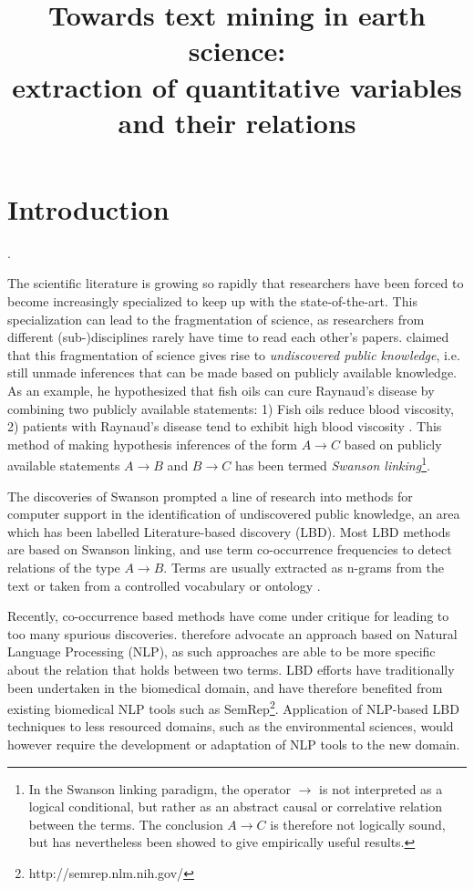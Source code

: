 \documentclass[10pt, a4paper]{article}
\title{Towards text mining in earth science:\\
extraction of quantitative variables and their relations}
\begin{document}
\maketitleabstract

\section{Introduction}


.

The scientific literature is growing so rapidly that researchers have been forced to become increasingly specialized to keep up with the state-of-the-art. 
This specialization can lead to the fragmentation of science, as researchers from different (sub-)disciplines rarely have time to read each other's papers. 
 claimed that this fragmentation of science gives rise to \emph{undiscovered public knowledge}, i.e. still unmade inferences that can be made based on publicly available knowledge. As an example, he hypothesized that fish oils can cure Raynaud's disease by combining two publicly available statements: 1) Fish oils reduce blood viscosity, 2) patients with Raynaud's disease tend to exhibit high blood viscosity \cite{Swanson1986Fishoil}. 
This method of making hypothesis inferences of the form $A \to C$ based on publicly available statements $A \to B$ and $B \to C$ has been termed \emph{Swanson linking}\footnote{In the Swanson linking paradigm, the operator $\to$ is not interpreted as a logical conditional, but rather as an abstract causal or correlative relation between the terms. The conclusion $A \to C$ is therefore not logically sound, but has nevertheless been showed to give empirically useful results.}. 

The discoveries of Swanson prompted a line of research into methods for computer support in the identification of undiscovered public knowledge, an area which has been labelled Literature-based discovery (LBD). 
Most LBD methods are based on Swanson linking, and use term co-occurrence frequencies to detect relations of the type $A \to B$. 
Terms are usually extracted as n-grams from the text \cite{Lindsay1999LBDLexicalStat} or taken from a controlled vocabulary or ontology \cite{Weeber2001ConceptsInLBD}.

Recently, co-occurrence based methods have come under critique for leading to too many spurious discoveries.
 therefore advocate an approach based on Natural Language Processing (NLP), as such approaches are able to be more specific about the relation that holds between two terms. 
LBD efforts have traditionally been undertaken in the biomedical domain, and have therefore benefited from existing biomedical NLP tools such as SemRep\footnote{http://semrep.nlm.nih.gov/}.
Application of NLP-based LBD techniques to less resourced domains, such as the environmental sciences, would however require the development or adaptation of NLP tools to the new domain.
\end{document}
